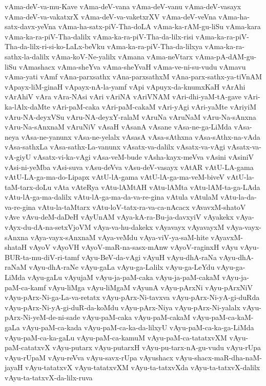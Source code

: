 {vAma-deV-va-mu-Kave
vAma-deV-vana
vAma-deV-vanu
vAma-deV-vasayx
vAma-deV-va-vakatxrX
vAma-deV-va-vaketxrXV
vAma-deV-veVna
vAma-ha-satx-davx-yeVna
vAma-ha-satx-piV-Tha-doLA
vAma-ka-rAM-gu-liSu
vAma-kara
vAma-ka-ra-piV-Tha-dalilx
vAma-ka-ra-piV-Tha-da-lilx-risi
vAma-ka-ra-piV-Tha-da-lilx-ri-si-ko-LaLx-beVku
vAma-ka-ra-piV-Tha-da-lilxya
vAma-ka-ra-sathx-la-dalilx
vAma-koV-Ne-yalilx
vAmana
vAma-neVtarx
vAma-pA-dAM-gu-liSu
vAmashacx
vAma-sheYva
vAma-sheYvaH
vAma-ve-ni-su-vudu
vAmavu
vAma-yati
vAmf
vAna-parxsathx
vAna-parxsathxM
vAna-parx-sathx-ya-tiVnAM
vApayx-liM-ginaH
vApayx-nA-la-yamf
vApi
vApuyx-da-knumxKaH
vArAhi
vArAhiV
vAra
vAra-NAsi
vAri
vAriNA
vAriVNAM
vAri-dhi-yaM-tA-gave
vAri-ka-lAlx-daMte
vAri-paM-caka
vAri-paM-cakaM
vAri-yAgi
vAri-yaMte
vAriyiM
vAru-NA-deyxVSu
vAru-NA-deyxY-ralaM
vAruNa
vAruNaM
vAru-Na-sAnxna
vAru-Na-sAnxnaM
vAruNiV
vAsaH
vAsanA
vAsane
vAsa-ne-ga-LiMda
vAsa-neya
vAsa-ne-yanunx
vAsa-ne-yelalx
vAsasA
vAsa-sAthxna
vAsa-sAthx-na-vAda
vAsa-sathxLa
vAsa-sathx-La-vanunx
vAsatx-va-dalilx
vAsatx-va-vAgi
vAsatx-va-vA-giyU
vAsatx-vi-ka-vAgi
vAsa-veM-bude
vAsha-kayx-meVva
vAsini
vAsiniV
vAsi-ni-yeMba
vAsi-suva
vAsu-deVva
vAsu-deV-vasayx
vAtAR
vAtU-LA-gama
vAtU-LA-ga-ma-do-Lipapx
vAtU-lA-gama
vAtU-lA-ga-ma-veM-biveV
vAtU-la-taM-tarx-doLu
vAta
vAteRya
vAtu-lAMtAH
vAtu-lAMta
vAtu-lAM-ta-ga-LAda
vAtu-lA-ga-ma-dalilx
vAtu-lA-ga-ma-da-va-re-gina
vAtula
vAtulaM
vAtu-la-da-va-re-gina
vAtu-la-taMtarx
vAtu-loV-tatx-ra-va-ca-nAcacx
vAvavxM-shatoV
vAve
vAvu-deM-daDeH
vAyUnAM
vAya-kA-ra-Bu-ja-davxyiV
vAyakekx
vAya-vAyx-du-dA-na-setxVjoVM
vAya-va-hu-dakekx
vAyavayx
vAyavayxM
vAya-vayx-sAnxna
vAya-vayx-sAnxnaM
vAya-veMdu
vAya-viV-ya-saM-hite
vAyavxM-shataH
vAyoV
vAyoVH
vAyoV-maR-na-sasx-mAnw
vAyoV-raginxH
vAyu
vAyu-BUR-ta-mu-diV-ri-tamf
vAyu-BeV-da-vAgi
vAyuH
vAyu-dhA-raNa
vAyu-dhA-raNaM
vAyu-dhA-raNe
vAyu-gaLa
vAyu-ga-Lalilx
vAyu-ga-LeYdu
vAyu-ga-LiMda
vAyu-gaLu
vAyujaM
vAyu-ja-paM-caka
vAyu-ja-paM-cakaM
vAyu-ja-paM-ca-kamf
vAyu-liMga
vAyu-liMgaM
vAyunA
vAyu-pArxNi
vAyu-pArxNiV
vAyu-pArx-Ni-ga-La-va-retatx
vAyu-pArx-Ni-tavxva
vAyu-pArx-Ni-yA-gi-duRda
vAyu-pArx-Ni-yA-gi-duR-da-koMdu
vAyu-pArx-Niya
vAyu-pArx-Ni-yalalx
vAyu-pArx-Ni-yeM-de-ni-sade
vAyu-paM-caka
vAyu-paM-cakaM
vAyu-paM-ca-kaM-gaLa
vAyu-paM-ca-kada
vAyu-paM-ca-ka-da-lilxyU
vAyu-paM-ca-ka-ga-LiMda
vAyu-paM-ca-ka-gaLu
vAyu-paM-ca-kamuM
vAyu-paM-ca-tatatxvXM
vAyu-paM-catatxvX
vAyu-putarx
vAyu-putarxH
vAyu-pu-tarx-nA-gu-vudu
vAyu-rUpa
vAyu-rUpaM
vAyu-reVva
vAyu-savx-rUpa
vAyushacx
vAyu-shacx-maR-dha-naM-jayaH
vAyu-tatatxvX
vAyu-tatatxvXM
vAyu-ta-tatxvXda
vAyu-ta-tatxvX-dalilx
vAyu-ta-tatxvX-da-lilx-ruva
}
